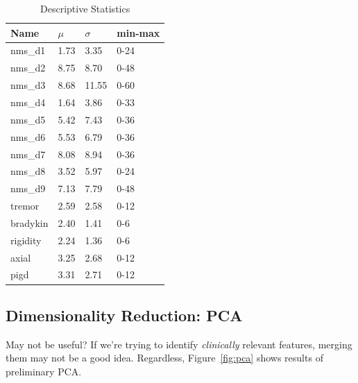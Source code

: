 \documentclass[letterpaper,12pt]{article}
\begin{document}
\begin{table}[h]
  \centering
  \begin{tabular}{l|l|l|l}
  Name  &       $\mu$ & $\sigma$ & min-max \\
         \hline
nms\_d1&   1.73&  3.35&   0-24 \\
nms\_d2&   8.75&  8.70&   0-48 \\
nms\_d3&   8.68& 11.55&   0-60 \\
nms\_d4&   1.64&  3.86&   0-33 \\
nms\_d5&   5.42&  7.43&   0-36 \\
nms\_d6&   5.53&  6.79&   0-36 \\
nms\_d7&   8.08&  8.94&   0-36 \\
nms\_d8&   3.52&  5.97&   0-24 \\
nms\_d9&   7.13&  7.79&   0-48 \\
tremor&   2.59&  2.58&   0-12 \\
bradykin& 2.40&  1.41&   0-6 \\
rigidity& 2.24&  1.36&   0-6 \\
axial&    3.25&  2.68&   0-12 \\
pigd&     3.31&  2.71&   0-12 \\
  \end{tabular}
  \caption{Descriptive Statistics}
  \label{tab:descriptive-statistics}
\end{table}

\subsection{Dimensionality Reduction: PCA}

May not be useful? If we're trying to identify \emph{clinically} relevant
features, merging them may not be a good idea. Regardless, Figure~\ref{fig:pca}
shows results of preliminary PCA.
\end{document}
